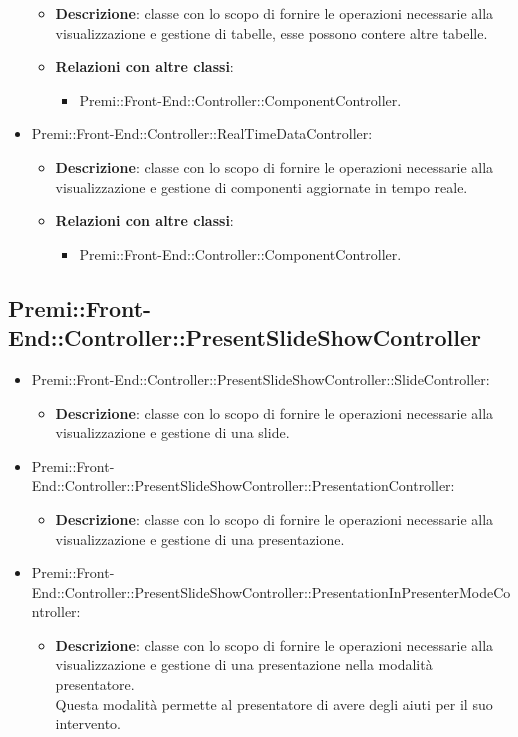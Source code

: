 \begin{itemize}
\begin{itemize}
				\item \textbf{Descrizione}: classe con lo scopo di fornire le operazioni necessarie alla visualizzazione e gestione di tabelle, esse possono contere altre tabelle.
				\item \textbf{Relazioni con altre classi}:
				\begin{itemize}
					\item Premi::Front-End::Controller::ComponentController.
				\end{itemize}
			\end{itemize}
		\item  Premi::Front-End::Controller::RealTimeDataController: 
			 \begin{itemize}
				\item \textbf{Descrizione}: classe con lo scopo di fornire le operazioni necessarie alla visualizzazione e gestione di componenti aggiornate in tempo reale.
				\item \textbf{Relazioni con altre classi}:
				\begin{itemize}
					\item Premi::Front-End::Controller::ComponentController.
				\end{itemize}
			\end{itemize}
			
		\end{itemize}
\subsection{Premi::Front-End::Controller::PresentSlideShowController}
	\begin{itemize}
		 \item Premi::Front-End::Controller::PresentSlideShowController::SlideController:
			\begin{itemize}
				\item \textbf{Descrizione}: classe con lo scopo di fornire le operazioni necessarie alla visualizzazione e gestione di una \gls{slide}.
			\end{itemize}
		\item  Premi::Front-End::Controller::PresentSlideShowController::PresentationController: 
			 \begin{itemize}
				\item \textbf{Descrizione}: classe con lo scopo di fornire le operazioni necessarie alla visualizzazione e gestione di una presentazione.
			\end{itemize}
		\item Premi::Front-End::Controller::PresentSlideShowController::PresentationInPresenterModeController:
			\begin{itemize}
				\item \textbf{Descrizione}: classe con lo scopo di fornire le operazioni necessarie alla visualizzazione e gestione di una presentazione nella modalità presentatore. 
				\\Questa modalità permette al presentatore di avere degli aiuti per il suo intervento.
			\end{itemize}
	\end{itemize}
	
